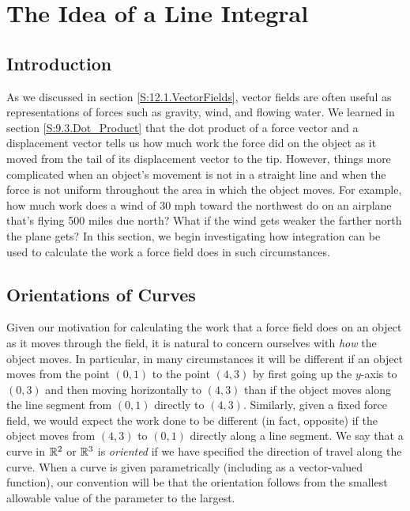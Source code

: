 \section{The Idea of a Line Integral} \label{S:12.2.IdeaLineIntegral}


\vspace*{-14 pt}

\subsection*{Introduction}

As we discussed in section \ref{S:12.1.VectorFields}, vector fields
are often useful as representations of forces such as gravity, wind,
and flowing water. We learned in section \ref{S:9.3.Dot_Product} that
the dot product of a force vector and a displacement vector tells us
how much work the force did on the object as it moved from the tail of
its displacement vector to the tip. However, things more complicated
when an object's movement is not in a straight line and when the force
is not uniform throughout the area in which the object moves. For
example, how much work does a wind of $30$ mph toward the northwest do
on an airplane that's flying 500 miles due north? What if the wind
gets weaker the farther north the plane gets? In this
section, we begin investigating how integration can be used to
calculate the work a force field does in such circumstances.



\subsection*{Orientations of Curves}

Given our motivation for calculating the work that a force field does
on an object as it moves through the field, it is natural to concern
ourselves with \emph{how} the object moves. In particular, in many
circumstances it will be different if an object moves from the point
$(0,1)$ to the point $(4,3)$ by first going up the $y$-axis to $(0,3)$
and then moving horizontally to $(4,3)$ than if the object moves along
the line segment from $(0,1)$ directly to $(4,3)$. Similarly, given a
fixed force field, we would expect the work done to be different (in
fact, opposite) if the object moves from $(4,3)$ to $(0,1)$ directly
along a line segment. We say that a curve in $\mathbb{R}^2$ or $\mathbb{R}^3$ is
\emph{oriented} if we have specified the direction of travel along the
curve. When a curve is given parametrically (including as a
vector-valued function), our convention will be that the orientation
follows from the smallest allowable value of the parameter to the largest.



